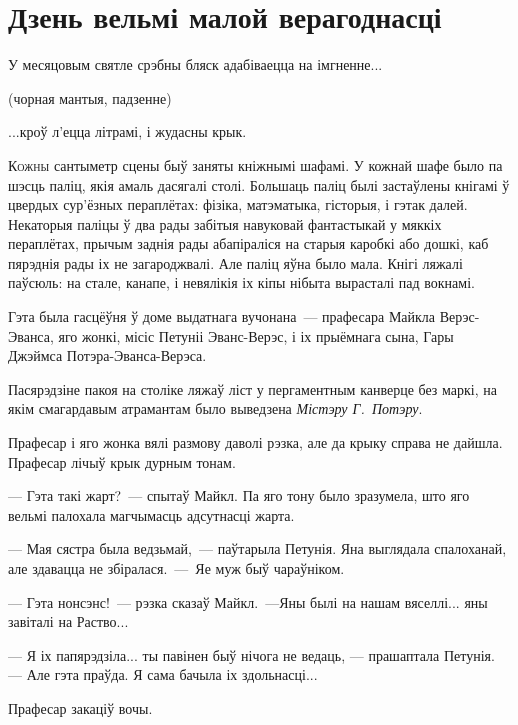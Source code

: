 \chapter{Дзень вельмі малой верагоднасці}


\begin{chapterOpeningQuote}
    \noindent
    У месяцовым святле срэбны бляск адабіваецца на імгненне...
    
    \vspace*{2ex}
    (чорная мантыя, падзенне)
    
    \vspace*{2ex}
    ...кроў л'ецца літрамі, і жудасны крык.
\end{chapterOpeningQuote}


\lettrine{К}{ожны} сантыметр сцены быў заняты кніжнымі шафамі.
У кожнай шафе было па шэсць паліц, якія амаль дасягалі столі.
Большаць паліц былі застаўлены кнігамі ў цвердых сур'ёзных пераплётах: фізіка, матэматыка, гісторыя,
і гэтак далей. Некаторыя паліцы ў два рады забітыя навуковай фантастыкай у мяккіх пераплётах, прычым 
заднія рады абапіраліся на старыя каробкі або дошкі, каб пярэднія рады іх не загароджвалі.
Але паліц яўна было мала. Кнігі ляжалі паўсюль: на стале, канапе, і невялікія іх кіпы нібыта вырасталі 
пад вокнамі. 

Гэта была гасцёўня ў доме выдатнага вучонана~--- прафесара Майкла Верэс-Эванса, яго жонкі, місіс
Петуніі Эванс-Верэс, і іх прыёмнага сына, Гары Джэймса Потэра-Эванса-Верэса.

Пасярэдзіне пакоя на століке ляжаў ліст у пергаментным канверце без маркі, на якім смагардавым
атрамантам было выведзена \emph{Містэру Г.~Потэру}.

Прафесар і яго жонка вялі размову даволі рэзка, але да крыку справа не дайшла. Прафесар
лічыў крык дурным тонам.

--- Гэта такі жарт?~--- спытаў Майкл. Па яго тону было зразумела, што яго вельмі палохала 
магчымасць адсутнасці жарта.

--- Мая сястра была ведзьмай,~--- паўтарыла Петунія. Яна выглядала спалоханай, але здавацца не
збіралася.~---~Яе муж быў чараўніком.

--- Гэта нонсэнс!~--- рэзка сказаў Майкл.~---Яны былі на нашам вяселлі... яны завіталі на Раство...

--- Я іх папярэдзіла... ты павінен быў нічога не ведаць, --- прашаптала Петунія. --- Але гэта праўда.
Я сама бачыла іх здольнасці...

Прафесар закаціў вочы.

